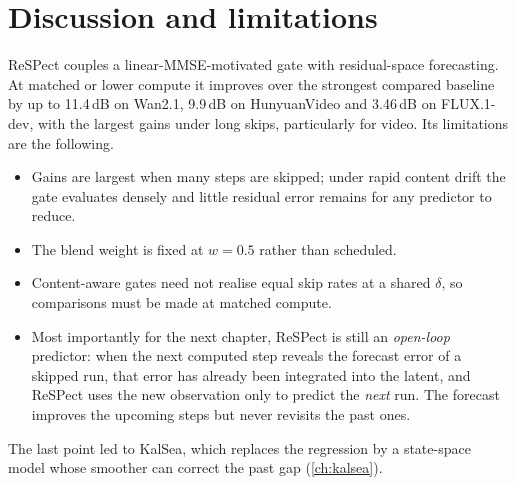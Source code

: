 \section{Discussion and limitations}\label{sec:respect-discussion}

ReSPect couples a linear-MMSE-motivated gate with residual-space forecasting. At matched or lower compute it improves over the strongest compared baseline by up to 11.4\,dB on Wan2.1, 9.9\,dB on HunyuanVideo and 3.46\,dB on FLUX.1-dev, with the largest gains under long skips, particularly for video. Its limitations are the following.
\begin{itemize}
  \item Gains are largest when many steps are skipped; under rapid content drift the gate evaluates densely and little residual error remains for any predictor to reduce.
  \item The blend weight is fixed at $w=0.5$ rather than scheduled.
  \item Content-aware gates need not realise equal skip rates at a shared $\delta$, so comparisons must be made at matched compute.
  \item Most importantly for the next chapter, ReSPect is still an \emph{open-loop} predictor: when the next computed step reveals the forecast error of a skipped run, that error has already been integrated into the latent, and ReSPect uses the new observation only to predict the \emph{next} run. The forecast improves the upcoming steps but never revisits the past ones.
\end{itemize}
The last point led to KalSea, which replaces the regression by a state-space model whose smoother can correct the past gap (\cref{ch:kalsea}).
